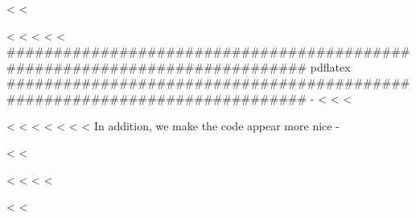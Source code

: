 \setsansfont[%
ItalicFont=NewCMSans10-Oblique.otf,%
BoldFont=NewCMSans10-Bold.otf,%
BoldItalicFont=NewCMSans10-BoldOblique.otf,%
SmallCapsFeatures={Numbers=OldStyle}]{NewCMSans10-Regular.otf}

\setmonofont[ItalicFont=NewCMMono10-Italic.otf,%
BoldFont=NewCMMono10-Bold.otf,%
BoldItalicFont=NewCMMono10-BoldOblique.otf,%
SmallCapsFeatures={Numbers=OldStyle}]{NewCMMono10-Regular.otf}

<%
<%

\usepackage{selnolig}
<%
<%
<%
\else
<%
<%
###########################################################################
pdflatex
###########################################################################
-%
<%
<%
<%
\usepackage[scaled=.95]{helvet}
<%
<%
<%
\RequirePackage{newtxtext}
\RequirePackage{newtxmath}
\RequirePackage[zerostyle=b,scaled=.9]{newtxtt}
<%
<%
<%
<%
In addition, we make the code appear more nice -%
\usepackage[zerostyle=b,scaled=.75]{newtxtt}
<%
<%
\usepackage{XCharter}
\usepackage[scaled=.95]{helvet}
<%
<%
<%
<%
\usepackage[%
  rm={oldstyle=false,proportional=true},%
  sf={oldstyle=false,proportional=true},%
  tt={oldstyle=false,proportional=true,variable=false},%
  qt=false%
]{cfr-lm}
<%
<%

